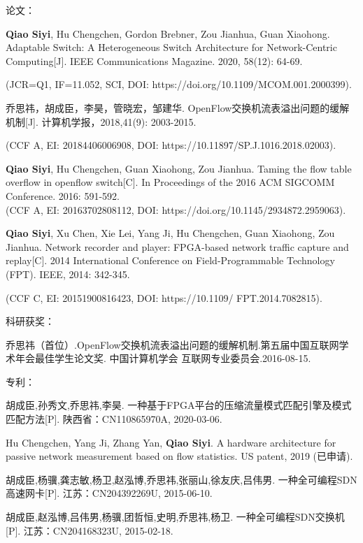 
{}




\noindent 论文：
\begin{publist}
	\item \textbf{Qiao Siyi}, Hu Chengchen, Gordon Brebner, Zou Jianhua, Guan Xiaohong. Adaptable Switch: A Heterogeneous Switch Architecture for Network-Centric Computing[J]. IEEE Communications Magazine. 2020, 58(12): 64-69.
	
	(JCR=Q1, IF=11.052, SCI, DOI: https://doi.org/10.1109/MCOM.001.2000399).
	\item {\hei 乔思祎}，胡成臣，李昊，管晓宏，邹建华. OpenFlow交换机流表溢出问题的缓解机制[J]. 计算机学报，2018,41(9): 2003-2015.
	
	(CCF A, EI: 20184406006908, DOI: https://10.11897/SP.J.1016.2018.02003).
	\item \textbf{Qiao Siyi}, Hu Chengchen, Guan Xiaohong, Zou Jianhua. Taming the flow table overflow in openflow switch[C]. In Proceedings of the 2016 ACM SIGCOMM Conference. 2016: 591-592.\\
	(CCF A, EI: 20163702808112, DOI: https://doi.org/10.1145/2934872.2959063).
	\item \textbf{Qiao Siyi}, Xu Chen, Xie Lei, Yang Ji, Hu Chengchen, Guan Xiaohong, Zou Jianhua. Network recorder and player: FPGA-based network traffic capture and replay[C]. 2014 International Conference on Field-Programmable Technology (FPT). IEEE, 2014: 342-345.
	
	(CCF C, EI: 20151900816423, DOI: https://10.1109/ FPT.2014.7082815).
\end{publist}

\noindent 科研获奖：
\begin{publist}
	\item {\hei 乔思祎}（首位）.OpenFlow交换机流表溢出问题的缓解机制.第五届中国互联网学术年会最佳学生论文奖. 中国计算机学会 互联网专业委员会.2016-08-15.
\end{publist}

\noindent 专利：
\begin{publist}
	
	\item 胡成臣,孙秀文,{\hei 乔思祎},李昊. 一种基于FPGA平台的压缩流量模式匹配引擎及模式匹配方法[P]. 陕西省：CN110865970A, 2020-03-06.
	\item Hu Chengchen, Yang Ji, Zhang Yan, \textbf{Qiao Siyi}. A hardware architecture for passive network measurement based on flow statistics. US patent, 2019 (已申请).
	\item 胡成臣,杨骥,龚志敏,杨卫,赵泓博,{\hei 乔思祎},张丽山,徐友庆,吕伟男. 一种全可编程SDN高速网卡[P]. 江苏：CN204392269U, 2015-06-10. 
	\item 胡成臣,赵泓博,吕伟男,杨骥,团哲恒,史明,{\hei 乔思祎},杨卫. 一种全可编程SDN交换机[P]. 江苏：CN204168323U, 2015-02-18.
\end{publist}






\vspace{\baselineskip}

\clearpage{\pagestyle{empty}\cleardoublepage}%
